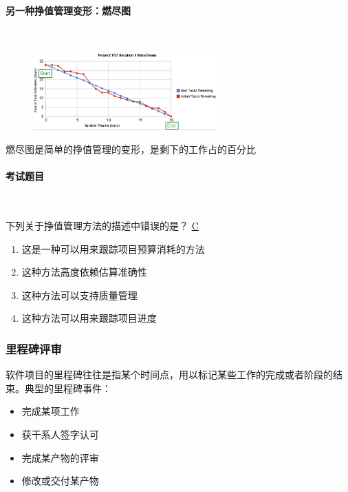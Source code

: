 \paragraph{另一种挣值管理变形：燃尽图}~{} \par
\begin{figure}[H]
    \vspace{-0.5em}
	\centering
	\includegraphics[width=0.63\textwidth]{images/燃尽图}
    \vspace{-1em}
\end{figure}
燃尽图是简单的挣值管理的变形，是剩下的工作占的百分比

\paragraph{考试题目}~{} \par
\begin{problem}
	下列关于挣值管理方法的描述中错误的是？
	\uline{C}    
    \vspace{-0.8em}
    \begin{multicols}{2}
        \begin{enumerate}[label=\Alph*.]
            \item 这是一种可以用来跟踪项目预算消耗的方法
            \item 这种方法高度依赖估算准确性
            \item 这种方法可以支持质量管理
            \item 这种方法可以用来跟踪项目进度
        \end{enumerate}
    \end{multicols}
    \vspace{-1em}
\end{problem}

\subsubsection{里程碑评审}
软件项目的里程碑往往是指某个时间点，用以标记某些工作的完成或者阶段的结束。典型的里程碑事件：
\vspace{-0.8em}
\begin{multicols}{4}
    \begin{itemize}
        \item 完成某项工作
        \item 获干系人签字认可
        \item 完成某产物的评审
        \item 修改或交付某产物
    \end{itemize}
\end{multicols}
\vspace{-1em}

